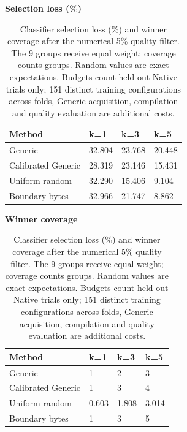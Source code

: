 \begin{table}[t]
\centering
\caption{Classifier selection loss (\%) and winner coverage after the numerical 5\% quality filter. The 9 groups receive equal weight; coverage counts groups. Random values are exact expectations. Budgets count held-out Native trials only; 151 distinct training configurations across folds, Generic acquisition, compilation and quality evaluation are additional costs.}
\label{tab:supp-calibration-summary}
\begingroup\small\setlength{\tabcolsep}{3pt}
\par\smallskip\textbf{Selection loss (\%)}\par\smallskip
\begin{tabular}{llll}
\toprule
Method & k=1 & k=3 & k=5 \\
\midrule
Generic & 32.804 & 23.768 & 20.448 \\
Calibrated Generic & 28.319 & 23.146 & 15.431 \\
Uniform random & 32.290 & 15.406 & 9.104 \\
Boundary bytes & 32.966 & 21.747 & 8.862 \\
\bottomrule
\end{tabular}
\par\smallskip\textbf{Winner coverage}\par\smallskip
\begin{tabular}{llll}
\toprule
Method & k=1 & k=3 & k=5 \\
\midrule
Generic & 1 & 2 & 3 \\
Calibrated Generic & 1 & 3 & 4 \\
Uniform random & 0.603 & 1.808 & 3.014 \\
Boundary bytes & 1 & 3 & 5 \\
\bottomrule
\end{tabular}
\endgroup
\end{table}
